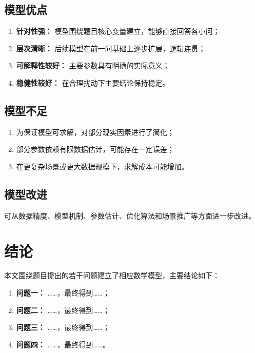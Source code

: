 \documentclass[UTF8,fontset=windows,a4paper,12pt]{ctexart}
\begin{document}
\subsection{模型优点}

\begin{enumerate}
  \item \textbf{针对性强：} 模型围绕题目核心变量建立，能够直接回答各小问；
  \item \textbf{层次清晰：} 后续模型在前一问基础上逐步扩展，逻辑连贯；
  \item \textbf{可解释性较好：} 主要参数具有明确的实际意义；
  \item \textbf{稳健性较好：} 在合理扰动下主要结论保持稳定。
\end{enumerate}

\subsection{模型不足}

\begin{enumerate}
  \item 为保证模型可求解，对部分现实因素进行了简化；
  \item 部分参数依赖有限数据估计，可能存在一定误差；
  \item 在更复杂场景或更大数据规模下，求解成本可能增加。
\end{enumerate}

\subsection{模型改进}

可从数据精度、模型机制、参数估计、优化算法和场景推广等方面进一步改进。

\section{结论}

本文围绕题目提出的若干问题建立了相应数学模型，主要结论如下：

\begin{enumerate}
  \item \textbf{问题一：} ……，最终得到……；
  \item \textbf{问题二：} ……，最终得到……；
  \item \textbf{问题三：} ……，最终得到……；
  \item \textbf{问题四：} ……，最终得到……。
\end{enumerate}
\end{document}
